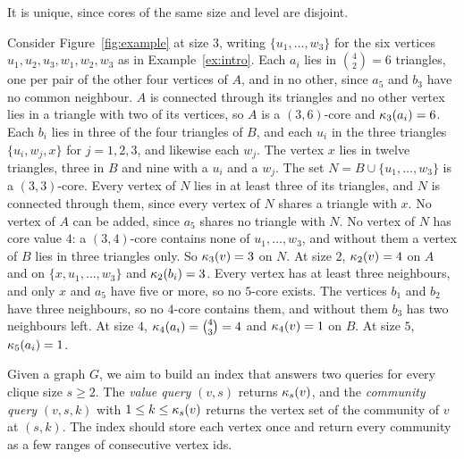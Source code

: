 %
It is unique, since cores of the same size and level are disjoint.
\begin{example}\label{ex:nucleus}
Consider Figure~\ref{fig:example} at size $3$, writing $\{u_1,\dots,w_3\}$ for the six vertices $u_1,u_2,u_3,w_1,w_2,w_3$ as in Example~\ref{ex:intro}.
%
Each $a_i$ lies in $\binom{4}{2}=6$ triangles, one per pair of the other four vertices of $A$, and in no other, since $a_5$ and $b_3$ have no common neighbour.
%
$A$ is connected through its triangles and no other vertex lies in a triangle with two of its vertices, so $A$ is a $(3,6)$-core and $\kappa_{3}(a_i)=6$.
%
Each $b_i$ lies in three of the four triangles of $B$, and each $u_i$ in the three triangles $\{u_i,w_j,x\}$ for $j=1,2,3$, and likewise each $w_j$.
%
The vertex $x$ lies in twelve triangles, three in $B$ and nine with a $u_i$ and a $w_j$.
%
The set $N=B\cup\{u_1,\dots,w_3\}$ is a $(3,3)$-core.
%
Every vertex of $N$ lies in at least three of its triangles, and $N$ is connected through them, since every vertex of $N$ shares a triangle with $x$.
%
No vertex of $A$ can be added, since $a_5$ shares no triangle with $N$.
%
No vertex of $N$ has core value $4$: a $(3,4)$-core contains none of $u_1,\dots,w_3$, and without them a vertex of $B$ lies in three triangles only.
%
So $\kappa_{3}(v)=3$ on $N$.
%
At size $2$, $\kappa_{2}(v)=4$ on $A$ and on $\{x,u_1,\dots,w_3\}$ and $\kappa_{2}(b_i)=3$.
%
Every vertex has at least three neighbours, and only $x$ and $a_5$ have five or more, so no $5$-core exists.
%
The vertices $b_1$ and $b_2$ have three neighbours, so no $4$-core contains them, and without them $b_3$ has two neighbours left.
%
At size $4$, $\kappa_{4}(a_i)=\binom{4}{3}=4$ and $\kappa_{4}(v)=1$ on $B$.
%
At size $5$, $\kappa_{5}(a_i)=1$.
\end{example}

Given a graph $G$, we aim to build an index that answers two queries for every clique size $s\ge2$.
%
The \textit{value query} $(v,s)$ returns $\kappa_{s}(v)$, and the \textit{community query} $(v,s,k)$ with $1\le k\le\kappa_{s}(v)$ returns the vertex set of the community of $v$ at $(s,k)$.
%
The index should store each vertex once and return every community as a few ranges of consecutive vertex ids.
